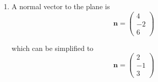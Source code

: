 \documentclass[leqno]{article}
\begin{document}
\begin{enumerate}[
  label=\textbf{\arabic*.},
  leftmargin=*,
  topsep=0pt,
  partopsep=0pt,
  parsep=0pt
]
\begin{djsSolution}
\begin{enumerate}[label=\textbf{(\alph*)}]
  Now
  \[
  \overrightarrow{PR}=\overrightarrow{OR}-\overrightarrow{OP}=\begin{pmatrix}0\\1\\3\end{pmatrix}-\begin{pmatrix}2\\-1\\1\end{pmatrix}=\begin{pmatrix}-2\\2\\2\end{pmatrix}
  \]

  Now calculate the vector product:
  \begin{align*}
  \overrightarrow{PQ}\times\overrightarrow{PR}
  &=
  \begin{vmatrix}
  \mathbf i & \mathbf j & \mathbf k\\
  1 & 2 & 0\\
  -2 & 2 & 2
  \end{vmatrix} \\
  &=\mathbf i(2\times 2-0\times 2)-\mathbf j\bigl(1\times 2-0\times(-2)\bigr)+\mathbf k\bigl(1\times 2-2\times(-2)\bigr) \\
  &=\begin{pmatrix}4\\-2\\6\end{pmatrix}
  \end{align*}

  Its magnitude is
  \[
  \left|\overrightarrow{PQ}\times\overrightarrow{PR}\right|
  =\sqrt{4^2+(-2)^2+6^2}
  =\sqrt{16+4+36}
  =\sqrt{56}
  =2\sqrt{14}
  \]

  The area of triangle $PQR$ is
  \[
  \frac12\left|\overrightarrow{PQ}\times\overrightarrow{PR}\right|
  \]

  so
  \[
  \text{Area}=\frac12\left(2\sqrt{14}\right)=\sqrt{14}
  \]

  Hence the area of triangle $PQR$ is $\sqrt{14}$.

  \item A normal vector to the plane is
  \[
  \mathbf n=
  \begin{pmatrix}
  4\\
  -2\\
  6
  \end{pmatrix}
  \]

  which can be simplified to
  \[
  \mathbf n=
  \begin{pmatrix}
  2\\
  -1\\
  3
  \end{pmatrix}
  \]


\end{enumerate}
\end{djsSolution}
\end{enumerate}
\end{document}
